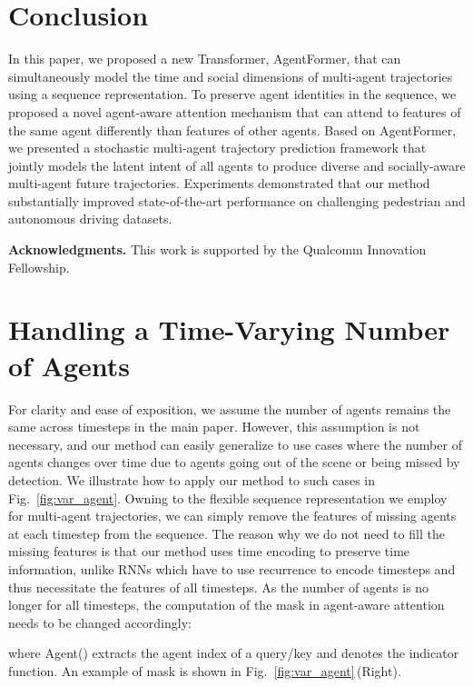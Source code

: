 \documentclass[10pt,twocolumn,letterpaper]{article}
\newcommand{\mname}{AgentFormer}
\begin{document}
\section{Conclusion}
In this paper, we proposed a new Transformer, \mname, that can simultaneously model the time and social dimensions of multi-agent trajectories using a sequence representation. To preserve agent identities in the sequence, we proposed a novel agent-aware attention mechanism that can attend to features of the same agent differently than features of other agents. Based on \mname, we presented a stochastic multi-agent trajectory prediction framework that jointly models the latent intent of all agents to produce diverse and socially-aware multi-agent future trajectories. Experiments demonstrated that our method substantially improved state-of-the-art performance on challenging pedestrian and autonomous driving datasets.

\vspace{2mm}
\noindent\textbf{Acknowledgments.} This work is supported by the Qualcomm Innovation Fellowship.

{\small


}

\onecolumn
\appendix

\section{Handling a Time-Varying Number of Agents}
For clarity and ease of exposition, we assume the number of agents remains the same across timesteps in the main paper. However, this assumption is not necessary, and our method can easily generalize to use cases where the number of agents changes over time due to agents going out of the scene or being missed by detection. We illustrate how to apply our method to such cases in Fig.~\ref{fig:var_agent}. Owning to the flexible sequence representation we employ for multi-agent trajectories, we can simply remove the features of missing agents at each timestep from the sequence. The reason why we do not need to fill the missing features is that our method uses time encoding to preserve time information, unlike RNNs which have to use recurrence to encode timesteps and thus necessitate the features of all timesteps. As the number of agents is no longer  for all timesteps, the computation of the mask  in agent-aware attention needs to be changed accordingly:

where Agent() extracts the agent index of a query/key and  denotes the indicator function. An example of mask  is shown in Fig.~\ref{fig:var_agent}\,(Right).
\end{document}
